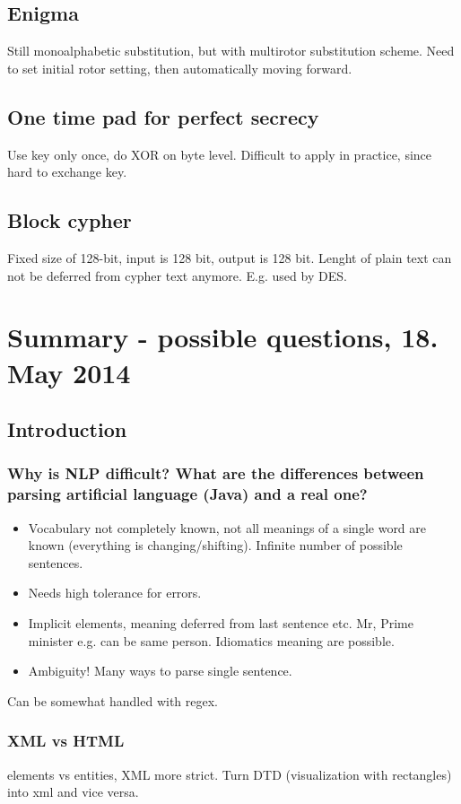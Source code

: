 \documentclass[11pt]{article}
\begin{document}
\subsection{Enigma}
Still monoalphabetic substitution, but with multirotor substitution scheme. Need to set initial
rotor setting, then automatically moving forward. 

\subsection{One time pad for perfect secrecy}
Use key only once, do XOR on byte level. Difficult to apply in practice, since hard to exchange
key. 
\subsection{Block cypher}
Fixed size of 128-bit, input is 128 bit, output is 128 bit. Lenght of plain text can not be
deferred from cypher text anymore. E.g. used by DES.

\section{Summary - possible questions, 18. May 2014 }
\subsection{Introduction}
\subsubsection{Why is NLP difficult? What are the differences between parsing artificial language (Java) and 
a real one?}
\begin{itemize}
	\item Vocabulary not completely known, not all meanings of a single word are known (everything is 
changing/shifting). Infinite number of possible sentences.
	\item Needs high tolerance for errors.
	\item Implicit elements, meaning deferred from last sentence etc. Mr, Prime minister e.g. 
	can be same person. Idiomatics meaning are possible. 
	\item Ambiguity! Many ways to parse single sentence.
\end{itemize}
Can be somewhat handled with regex. 
\subsubsection{XML vs HTML}
elements vs entities, XML more strict. Turn DTD (visualization with rectangles) 
into xml and vice versa.
\end{document}
